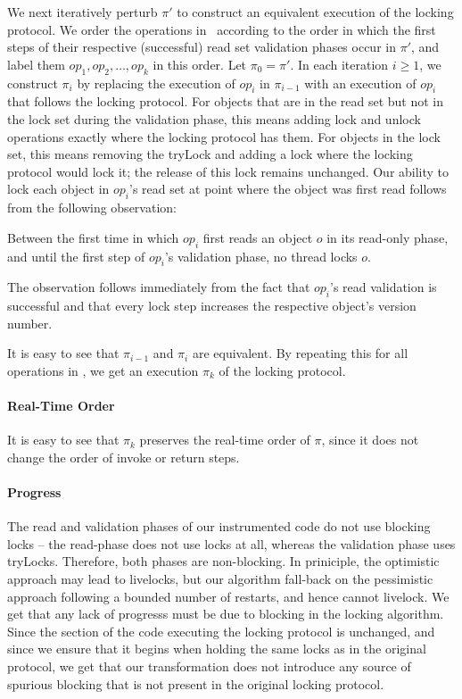 We next iteratively perturb $\pi'$ to construct an equivalent execution of the locking protocol.
We order the operations in \op\ according to the order in which the first steps of their respective (successful) read set validation phases occur in $\pi'$,
and label them $op_1, op_2, \ldots, op_k$ in this order. Let $\pi_0 = \pi'$. In each iteration $i \geq 1$, we construct $\pi_i$ by replacing the execution of $op_i$
in $\pi_{i-1}$ with an execution of $op_i$ that follows the locking protocol. For objects that are in the read set but not in the lock set during the validation phase, this means adding lock and unlock operations exactly where the locking protocol has them. For objects in the lock set, this means removing the tryLock and adding a lock where the locking protocol would lock it; the release of this lock remains unchanged. 
Our ability to lock each object in $op_i$'s read set at 
point where the object was first read follows from the following observation:
\begin{observation}
Between the first time in which $op_i$ first reads an object $o$ in its read-only phase, and until the first step of $op_i$'s validation phase, no
 thread locks $o$. 
\end{observation}
The observation follows immediately from the fact that $op_i$'s read validation is successful and that every lock step increases the
respective object's version number. 

It is easy to see that $\pi_{i-1}$ and $\pi_i$ are equivalent. By repeating this for all operations in \op, we get an execution $\pi_k$ of the locking 
protocol.

\paragraph{Real-Time Order}
It is easy to see that $\pi_k$ preserves the real-time order of $\pi$, since it does not change the order of invoke or return steps. 

\paragraph{Progress}
The read and validation phases of our instrumented code do not use blocking locks -- the read-phase does not use locks at all, whereas the 
validation phase uses tryLocks. Therefore, both phases are non-blocking. In priniciple, the optimistic approach may lead to livelocks, but 
our algorithm fall-back on the pessimistic approach following a bounded number of restarts, and hence cannot livelock. We get that any lack
of progresss must be due to blocking in the locking algorithm. Since the section of the code executing the locking protocol is unchanged, and
since we ensure that it begins when holding the same locks as in the original protocol, we get that our transformation does not introduce any
source of spurious blocking that is not present in the original locking protocol. 


